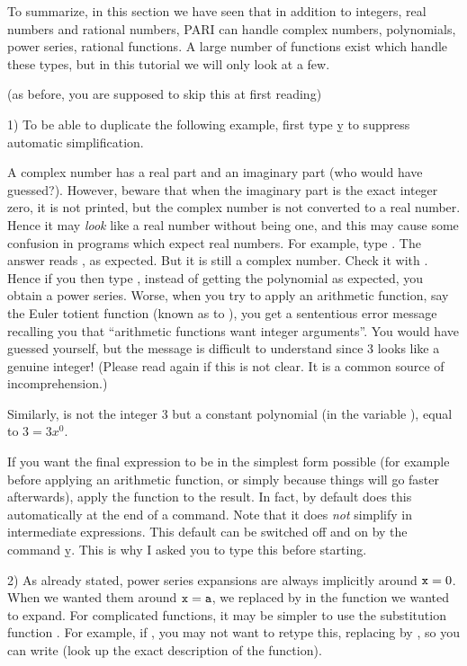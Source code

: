 To summarize, in this section we have seen that in addition to integers, real
numbers and rational numbers, PARI can handle complex numbers, polynomials,
power series, rational functions. A large number of functions exist which
handle these types, but in this tutorial we will only look at a few.

 (as before, you are supposed to skip this
at first reading)

1) To be able to duplicate the following example, first type \b{y} to
suppress automatic simplification.

A complex number has a real part and an imaginary part (who would have
guessed?). However, beware that when the imaginary part is the exact integer
zero, it is not printed, but the complex number is not converted to a real
number. Hence it may \emph{look} like a real number without being one, and
this may cause some confusion in programs which expect real numbers. For
example, type . The answer reads , as expected. But
it is still a complex number. Check it with . Hence if you then
type , instead of getting the polynomial
 as expected, you obtain a power series.
Worse, when you try to apply an arithmetic function, say the Euler totient
function (known as  to ), you get a sententious error message
recalling you that ``arithmetic functions want integer arguments''. You would
have guessed yourself, but the message is difficult to understand since 3 looks
like a genuine integer! (Please read again if this is not clear. It is a
common source of incomprehension.)

Similarly,  is not the integer 3 but a constant polynomial
(in the variable ), equal to $3 = 3x^0$.

If you want the final expression to be in the simplest form possible (for
example before applying an arithmetic function, or simply because things will
go faster afterwards), apply the function  to the result. In
fact, by default  does this automatically at the end of a  command. Note
that it does \emph{not} simplify in intermediate expressions. This default
can be switched off and on by the command \b{y}. This is why I asked you to
type this before starting.

2) As already stated, power series expansions are always implicitly around
${\tt x} = 0$. When we wanted them around ${\tt x} = {\tt a}$, we replaced
 by  in the function we wanted to expand. For complicated
functions, it may be simpler to use the substitution function .
For example, if ,
you may not want to retype this, replacing  by , so you can
write  (look up the exact description of the
 function).

